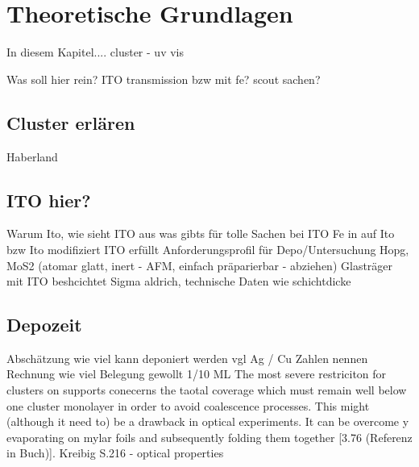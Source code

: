 \chapter{Theoretische Grundlagen}
In diesem Kapitel....
cluster - \cite{haberland}
uv vis \cite{kreibig}

Was soll hier rein? ITO transmission bzw mit fe? scout sachen?

\section{Cluster erlären}
Haberland
\section{ITO hier?}
Warum Ito, wie sieht ITO aus
was gibts für tolle Sachen  bei ITO
Fe in auf Ito bzw Ito modifiziert
ITO erfüllt Anforderungsprofil für Depo/Untersuchung
Hopg, MoS2 (atomar glatt, inert - AFM, einfach präparierbar - abziehen)
Glasträger mit ITO beshcichtet Sigma aldrich, technische Daten wie schichtdicke
\section{Depozeit}
\label{sec:depo}
Abschätzung wie viel kann deponiert werden vgl Ag / Cu Zahlen nennen
Rechnung wie viel Belegung gewollt 1/10 ML
The most severe restriciton for clusters on supports conecerns the taotal coverage which must remain well below one cluster monolayer in order to avoid coalescence processes.
This might (although it need to) be a drawback in optical experiments.
It can be overcome y evaporating on mylar foils and subsequently folding them together [3.76 (Referenz in Buch)].
Kreibig \cite[S.216]{Kreibig.1995} S.216 - optical properties

